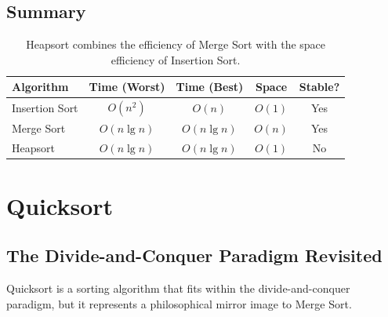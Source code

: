 \documentclass[12pt]{article}
\theoremstyle{blueplain}
\theoremstyle{bluedef}
\theoremstyle{blueremark}
\begin{document}
\subsection{Summary}
\begin{table}[h]
    \centering
    \begin{tabular}{|l|c|c|c|c|}
        \hline
        \textbf{Algorithm} & \textbf{Time (Worst)} & \textbf{Time (Best)} & \textbf{Space} & \textbf{Stable?} \\ \hline
        Insertion Sort     & $O(n^2)$              & $O(n)$               & $O(1)$         & Yes              \\ \hline
        Merge Sort         & $O(n \lg n)$          & $O(n \lg n)$         & $O(n)$         & Yes              \\ \hline
        Heapsort           & $O(n \lg n)$          & $O(n \lg n)$         & $O(1)$         & No               \\ \hline
    \end{tabular}
    \caption{Heapsort combines the efficiency of Merge Sort with the space efficiency of Insertion Sort.}
\end{table}

\clearpage


\section{Quicksort}

\subsection{The Divide-and-Conquer Paradigm Revisited}

Quicksort is a sorting algorithm that fits within the divide-and-conquer paradigm, but it represents a philosophical mirror image to Merge Sort.
\end{document}
